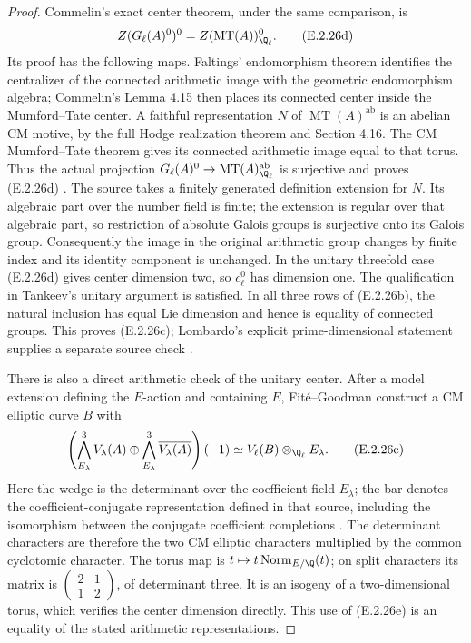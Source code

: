 \begin{proof}
Commelin's exact center theorem, under the same comparison, is
\[
 Z(G_\ell(A)^0)^0
     = Z(\operatorname{MT}(A))^0_{\Q_\ell}.
 \tag{E.2.26d}
\]
Its proof has the following maps. Faltings' endomorphism theorem
identifies the centralizer of the connected arithmetic image with
the geometric endomorphism algebra; Commelin's Lemma 4.15 then
places its connected center inside the Mumford--Tate center. A
faithful representation \(N\) of
\(\operatorname{MT}(A)^{\mathrm{ab}}\) is an abelian CM motive,
by the full Hodge realization theorem and Section 4.16. The CM
Mumford--Tate theorem gives its connected arithmetic image equal
to that torus. Thus the actual projection
\(G_\ell(A)^0\to\operatorname{MT}(A)^{\mathrm{ab}}_{\Q_\ell}\)
is surjective and proves (E.2.26d)
\cite[Theorem 4.13, Lemmas 4.15--4.18 and proof,
pp.~658--659]{GenCommelin2019}.
The source takes a finitely generated definition extension for
\(N\). Its algebraic part over the number field is finite; the
extension is regular over that algebraic part, so restriction of
absolute Galois groups is surjective onto its Galois group.
Consequently the image in the original arithmetic group changes
by finite index and its identity component is unchanged.
In the unitary threefold case (E.2.26d) gives center dimension two,
so \(c_\ell^0\) has dimension one. The qualification in Tankeev's
unitary argument is satisfied. In all three rows of (E.2.26b),
the natural inclusion has equal Lie dimension and hence is equality
of connected groups. This proves (E.2.26c); Lombardo's explicit
prime-dimensional statement supplies a separate source check
\cite[Theorem 2.18, p.~6]{GenLombardoNonsimple2015}.

There is also a direct arithmetic check of the unitary center.
After a model extension defining the \(E\)-action and containing
\(E\), Fit\'e--Goodman construct a CM elliptic curve \(B\) with
\[
 \left(\bigwedge_{E_\lambda}^3 V_\lambda(A)
       \oplus\bigwedge_{E_\lambda}^3\overline{V_\lambda(A)}\right)(-1)
       \simeq V_\ell(B)\otimes_{\Q_\ell}E_\lambda.
 \tag{E.2.26e}
\]
Here the wedge is the determinant over the coefficient field
\(E_\lambda\); the bar denotes the coefficient-conjugate
representation defined in that source, including the isomorphism
between the conjugate coefficient completions
\cite[Theorem 1.1(i), p.~2, and Theorem 3.1 with proof,
pp.~9--10]{GenFiteGoodman2026}.
The determinant characters are therefore the two CM elliptic
characters multiplied by the common cyclotomic character.
The torus map is
\(t\mapsto t\operatorname{Norm}_{E/\Q}(t)\); on split
characters its matrix is
\(\left(\begin{smallmatrix}2&1\\1&2\end{smallmatrix}\right)\),
of determinant three. It is an isogeny of a two-dimensional torus,
which verifies the center dimension directly. This use of
(E.2.26e) is an equality of the stated arithmetic representations.


\end{proof}
